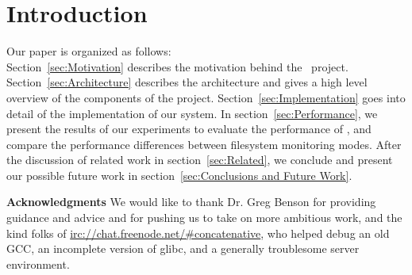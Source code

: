 \section{Introduction}
\label{sec:Introduction}


Our paper is organized as follows:\\
Section~\ref{sec:Motivation} describes the motivation behind the \teledroid\ project.
Section~\ref{sec:Architecture} describes the architecture and gives a high level overview of the components of the project.
Section~\ref{sec:Implementation} goes into detail of the implementation of our system.
In section~\ref{sec:Performance}, we present the results of our experiments to evaluate the performance of \teledroid, and compare the performance differences between filesystem monitoring modes.
After the discussion of related work in section~\ref{sec:Related}, we conclude and present our possible future work 
in section~\ref{sec:Conclusions and Future Work}.

{\bf Acknowledgments}  We would like to thank Dr. Greg Benson for providing guidance and advice and for pushing us to 
take on more ambitious work, and the kind folks of \url{irc://chat.freenode.net/#concatenative}, who helped debug an old 
GCC, an incomplete version of glibc, and a generally troublesome server environment.